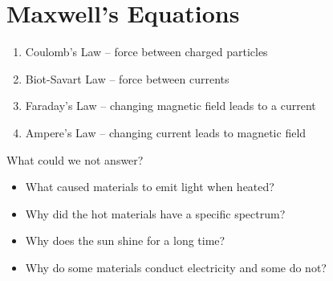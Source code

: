 \documentclass[a4paper, 11pt, normalem]{report}
\begin{document}
\section{Maxwell's Equations}
\begin{enumerate}
    \item Coulomb's Law -- force between charged particles
    \item Biot-Savart Law -- force between currents
    \item Faraday's Law -- changing magnetic field leads to a current
    \item Ampere's Law -- changing current leads to magnetic field
\end{enumerate}
What could we not answer?
\begin{itemize}
    \item What caused materials to emit light when heated?
    \item Why did the hot materials have a specific spectrum?
    \item Why does the sun shine for a long time?
    \item Why do some materials conduct electricity and some do not?
\end{itemize}
\end{document}
